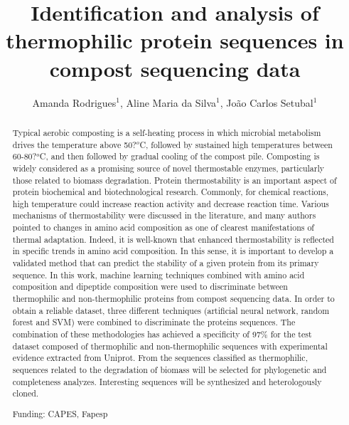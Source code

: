 \documentclass[twoside]{article}
\title{\vspace{-15mm}\fontsize{24pt}{10pt}\selectfont\textbf{Identification and analysis of thermophilic protein sequences in compost sequencing data}} %
\author{Amanda Rodrigues$^1$, Aline Maria da Silva$^1$, Jo\~ao Carlos Setubal$^1$}
\affil{1 USP\\ }
\date{}
\begin{document}
\maketitle %

\thispagestyle{fancy} %


\begin{abstract}
Typical aerobic composting is a self-heating process in which microbial metabolism drives the temperature above 50?$^o$C, followed by sustained high temperatures between 60-80?$^o$C, and then followed by gradual cooling of the compost pile. Composting is widely considered as a promising source of novel thermostable enzymes, particularly those related to biomass degradation. Protein thermostability is an important aspect of protein biochemical and biotechnological research. Commonly, for chemical reactions, high temperature could increase reaction activity and decrease reaction time. Various mechanisms of thermostability were discussed in the literature, and many authors pointed to changes in amino acid composition as one of clearest manifestations of thermal adaptation. Indeed, it is well-known that enhanced thermostability is reflected in specific trends in amino acid composition. In this sense, it is important to develop a validated method that can predict the stability of a given protein from its primary sequence. In this work, machine learning techniques combined with amino acid composition and dipeptide composition were used to discriminate between thermophilic and non-thermophilic proteins from compost sequencing data. In order to obtain a reliable dataset, three different techniques (artificial neural network, random forest and SVM) were combined to discriminate the proteins sequences. The combination of these methodologies has achieved a specificity of 97\% for the test dataset composed of thermophilic and non-thermophilic sequences with experimental evidence extracted from Uniprot. From the sequences classified as thermophilic, sequences related to the degradation of biomass will be selected for phylogenetic and completeness analyzes. Interesting sequences will be synthesized and heterologously cloned.

Funding: CAPES, Fapesp
\end{abstract}
\end{document}

